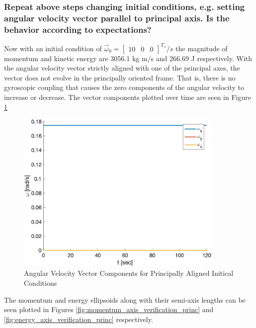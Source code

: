 \subsubsection{Repeat above steps changing initial conditions, e.g. setting angular velocity vector parallel to principal axis. Is the behavior according to expectations?} \label{sec:principally_aligned_omega}

Now with an initial condition of $\vec{\omega}_0 = \begin{bmatrix}
    10 & 0 & 0
\end{bmatrix}^T {}^{\circ}/s$ the magnitude of momentum and kinetic energy are 3056.1 kg m/s and 266.69 J respectively. With the angular velocity vector strictly aligned with one of the principal axes, the vector does not evolve in the principally oriented frame. That is, there is no gyroscopic coupling that causes the zero components of the angular velocity to increase or decrease. The vector components plotted over time are seen in Figure \ref{fig:sim_omegas_principal} 

\begin{figure}[H]
    \centering
    \includegraphics[width = 10cm]{Images/omega_prop_principal.png}
    \caption{Angular Velocity Vector Components for Principally Aligned Initical Conditions}
    \label{fig:sim_omegas_principal}
\end{figure}

The momentum and energy ellipsoids along with their semi-axis lengths can be seen plotted in Figures \ref{fig:momentum_axis_verification_princ} and \ref{fig:energy_axis_verification_princ} respectively.

